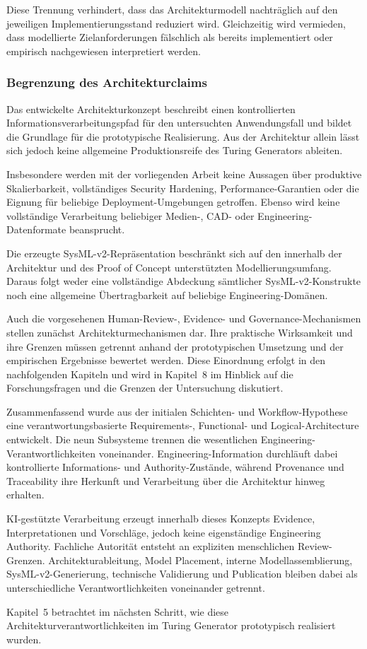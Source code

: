 Diese Trennung verhindert, dass das Architekturmodell nachträglich auf den
jeweiligen Implementierungsstand reduziert wird. Gleichzeitig wird vermieden,
dass modellierte Zielanforderungen fälschlich als bereits implementiert oder
empirisch nachgewiesen interpretiert werden.


\subsubsection{Begrenzung des Architekturclaims}
\label{sec:architecture_claim_boundaries}

Das entwickelte Architekturkonzept beschreibt einen kontrollierten
Informationsverarbeitungspfad für den untersuchten Anwendungsfall und bildet
die Grundlage für die prototypische Realisierung. Aus der Architektur allein
lässt sich jedoch keine allgemeine Produktionsreife des Turing Generators
ableiten.

Insbesondere werden mit der vorliegenden Arbeit keine Aussagen über
produktive Skalierbarkeit, vollständiges Security Hardening,
Performance-Garantien oder die Eignung für beliebige
Deployment-Umgebungen getroffen. Ebenso wird keine vollständige Verarbeitung
beliebiger Medien-, CAD- oder Engineering-Datenformate beansprucht.

Die erzeugte SysML-v2-Repräsentation beschränkt sich auf den innerhalb der
Architektur und des Proof of Concept unterstützten Modellierungsumfang.
Daraus folgt weder eine vollständige Abdeckung sämtlicher SysML-v2-Konstrukte
noch eine allgemeine Übertragbarkeit auf beliebige Engineering-Domänen.

Auch die vorgesehenen Human-Review-, Evidence- und Governance-Mechanismen
stellen zunächst Architekturmechanismen dar. Ihre praktische Wirksamkeit und
ihre Grenzen müssen getrennt anhand der prototypischen Umsetzung und der
empirischen Ergebnisse bewertet werden. Diese Einordnung erfolgt in den
nachfolgenden Kapiteln und wird in Kapitel~8 im Hinblick auf die
Forschungsfragen und die Grenzen der Untersuchung diskutiert.

Zusammenfassend wurde aus der initialen Schichten- und Workflow-Hypothese eine
verantwortungsbasierte Requirements-, Functional- und Logical-Architecture
entwickelt. Die neun Subsysteme trennen die wesentlichen
Engineering-Verantwortlichkeiten voneinander. Engineering-Information
durchläuft dabei kontrollierte Informations- und Authority-Zustände, während
Provenance und Traceability ihre Herkunft und Verarbeitung über die
Architektur hinweg erhalten.

KI-gestützte Verarbeitung erzeugt innerhalb dieses Konzepts Evidence,
Interpretationen und Vorschläge, jedoch keine eigenständige Engineering
Authority. Fachliche Autorität entsteht an expliziten menschlichen
Review-Grenzen. Architekturableitung, Model Placement, interne
Modellassemblierung, SysML-v2-Generierung, technische Validierung und
Publication bleiben dabei als unterschiedliche Verantwortlichkeiten
voneinander getrennt.

Kapitel~5 betrachtet im nächsten Schritt, wie diese
Architekturverantwortlichkeiten im Turing Generator prototypisch realisiert
wurden.
